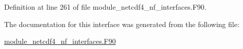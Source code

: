 Definition at line 261 of file module\+\_\+netcdf4\+\_\+nf\+\_\+interfaces.\+F90.



The documentation for this interface was generated from the following file\+:\begin{DoxyCompactItemize}
\item 
\hyperlink{module__netcdf4__nf__interfaces_8F90}{module\+\_\+netcdf4\+\_\+nf\+\_\+interfaces.\+F90}\end{DoxyCompactItemize}
